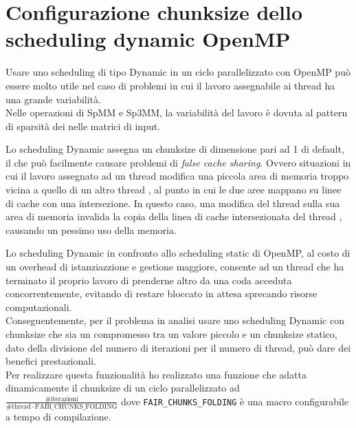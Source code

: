 \section{Configurazione chunksize dello scheduling dynamic OpenMP} \label{chSpMMAux:dynChunkFairAdapting}
Usare uno scheduling di tipo Dynamic in un ciclo parallelizzato con OpenMP 
può essere molto utile nel caso di problemi in cui il lavoro assegnabile ai thread ha una grande variabilità.\\
Nelle operazioni di SpMM e Sp3MM, la variabilità del lavoro è dovuta 
al pattern di sparsità dei \nnz nelle matrici di input.\\
\par\null\par
Lo scheduling Dynamic assegna un chunksize di dimensione pari ad 1 di default, 
il che può facilmente causare problemi di \emph{false cache sharing}.
Ovvero situazioni in cui il lavoro assegnato ad un thread  modifica una piccola area di memoria
troppo vicina a quello di un altro thread , 
al punto in cui le due aree mappano su linee di cache con una intersezione. 
In questo caso, una modifica del thread  sulla sua area di memoria invalida la 
copia della linea di cache intersezionata del thread , causando un pessimo uso della memoria.\\
\par\null\par
Lo scheduling Dynamic in confronto allo scheduling static di OpenMP, al costo di un overhead di istanziazzione e gestione maggiore,
consente ad un thread che ha terminato il proprio lavoro di prenderne altro da una coda acceduta concorrentemente,
evitando di restare bloccato in attesa sprecando risorse computazionali.\\
Conseguentemente, per il problema in analisi usare uno scheduling Dynamic con chunksize che sia un compromesso tra un valore piccolo e un 
chunksize statico, dato della divisione del numero di iterazioni per il numero di thread,
può dare dei benefici prestazionali.\\
Per realizzare questa funzionalità ho realizzato una funzione che adatta dinamicamente 
il chunksize di un ciclo parallelizzato ad $\frac{\#\text{iterazioni}}{\# \text{thread} \cdot \text{FAIR\_CHUNKS\_FOLDING}}$
dove \verb|FAIR_CHUNKS_FOLDING| è una macro configurabile a tempo di compilazione.\\


